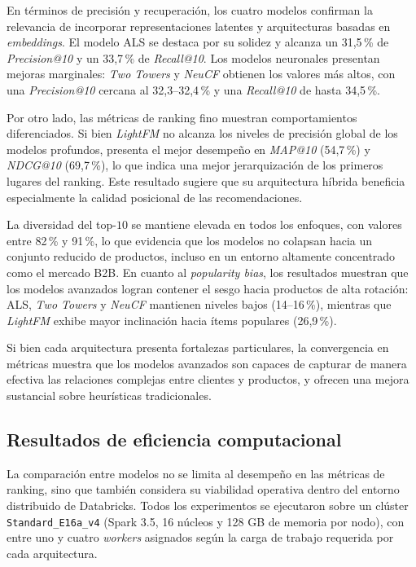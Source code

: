 En términos de precisión y recuperación, los cuatro modelos confirman la relevancia de incorporar representaciones latentes y arquitecturas basadas en \textit{embeddings}. El modelo ALS se destaca por su solidez y alcanza un 31{,}5\,\% de \textit{Precision@10} y un 33{,}7\,\% de \textit{Recall@10}. Los modelos neuronales presentan mejoras marginales: \textit{Two Towers} y \textit{NeuCF} obtienen los valores más altos, con una \textit{Precision@10} cercana al 32{,}3–32{,}4\,\% y una \textit{Recall@10} de hasta 34{,}5\,\%.

Por otro lado, las métricas de ranking fino muestran comportamientos diferenciados. Si bien \textit{LightFM} no alcanza los niveles de precisión global de los modelos profundos, presenta el mejor desempeño en \textit{MAP@10} (54{,}7\,\%) y \textit{NDCG@10} (69{,}7\,\%), lo que indica una mejor jerarquización de los primeros lugares del ranking. Este resultado sugiere que su arquitectura híbrida beneficia especialmente la calidad posicional de las recomendaciones.

La diversidad del top-$10$ se mantiene elevada en todos los enfoques, con valores entre 82\,\% y 91\,\%, lo que evidencia que los modelos no colapsan hacia un conjunto reducido de productos, incluso en un entorno altamente concentrado como el mercado B2B. En cuanto al \textit{popularity bias}, los resultados muestran que los modelos avanzados logran contener el sesgo hacia productos de alta rotación: ALS, \textit{Two Towers} y \textit{NeuCF} mantienen niveles bajos (14–16\,\%), mientras que \textit{LightFM} exhibe mayor inclinación hacia ítems populares (26,9\,\%).

Si bien cada arquitectura presenta fortalezas particulares, la convergencia en métricas muestra que los modelos avanzados son capaces de capturar de manera efectiva las relaciones complejas entre clientes y productos, y ofrecen una mejora sustancial sobre heurísticas tradicionales.


\subsection{Resultados de eficiencia computacional}

La comparación entre modelos no se limita al desempeño en las métricas de ranking, sino que también considera su viabilidad operativa dentro del entorno distribuido de Databricks.  
Todos los experimentos se ejecutaron sobre un clúster \texttt{Standard\_E16a\_v4} (Spark 3.5, 16 núcleos y 128 GB de memoria por nodo), con entre uno y cuatro \textit{workers} asignados según la carga de trabajo requerida por cada arquitectura.

